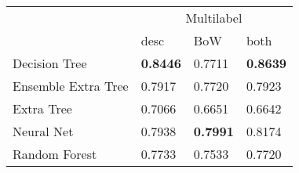 \begin{tabular}{|l|l|l|l| }
\hline
 &  \multicolumn{3}{c|}{Multilabel} \\
\cline{2-4} & desc & BoW & both \\ \hline
Decision Tree       & {\bf 0.8446} & 0.7711 & {\bf 0.8639}\\
Ensemble Extra Tree & 0.7917 & 0.7720 & 0.7923\\
Extra Tree          & 0.7066 & 0.6651 & 0.6642\\
Neural Net          & 0.7938 & {\bf 0.7991} & 0.8174\\
Random Forest       & 0.7733 & 0.7533 & 0.7720\\
\hline
\end{tabular}